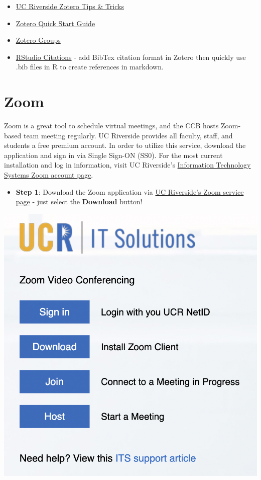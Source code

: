 \documentclass[
]{book}
\providecommand{\tightlist}{%
  \setlength{\itemsep}{0pt}\setlength{\parskip}{0pt}}
\begin{document}
\begin{itemize}
\tightlist
\item
  \href{https://guides.lib.ucr.edu/c.php?g=171064\&p=1126842}{UC Riverside Zotero Tips \& Tricks}
\item
  \href{https://www.zotero.org/support/quick_start_guide}{Zotero Quick Start Guide}
\item
  \href{https://www.zotero.org/support/groups}{Zotero Groups}
\item
  \href{https://www.youtube.com/watch?v=zuuOYjE8m98}{RStudio Citations} - add BibTex citation format in Zotero then quickly use .bib files in R to create references in markdown.
\end{itemize}

\hypertarget{zoom}{%
\section{Zoom}\label{zoom}}

Zoom is a great tool to schedule virtual meetings, and the CCB hosts Zoom-based team meeting regularly. UC Riverside provides all faculty, staff, and students a free premium account. In order to utilize this service, download the application and sign in via Single Sign-ON (SS0). For the most current installation and log in information, visit UC Riverside's \href{https://its.ucr.edu/blog/2019/12/17/changes-ucr-zoom-account-access}{Information Technology Systems Zoom account page}.

\begin{itemize}
\tightlist
\item
  \textbf{Step 1}: Download the Zoom application via \href{https://ucr.zoom.us/}{UC Riverside's Zoom service page} - just select the \textbf{Download} button!
\end{itemize}

\begin{center}\includegraphics{images/zoomdownload} \end{center}
\end{document}
